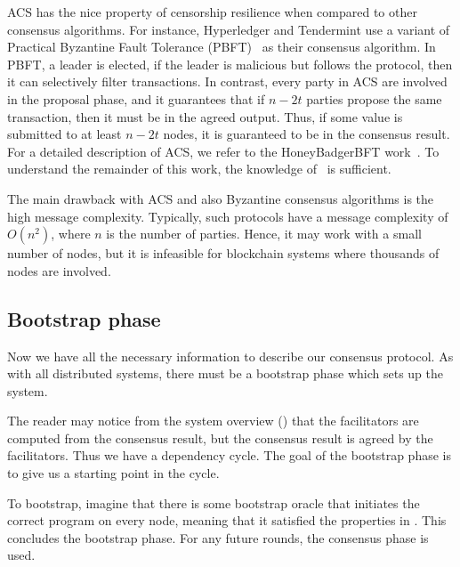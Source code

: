 ACS has the nice property of censorship resilience when compared to other consensus algorithms.
For instance, Hyperledger and Tendermint use a variant of Practical Byzantine Fault Tolerance (PBFT)~\cite{castro1999practical} as their consensus algorithm.
In PBFT, a leader is elected, if the leader is malicious but follows the protocol, then it can selectively filter transactions.
In contrast, every party in ACS are involved in the proposal phase,
and it guarantees that if $n - 2t$ parties propose the same transaction, then it must be in the agreed output.
Thus, if some value is submitted to at least $n - 2t$ nodes, it is guaranteed to be in the consensus result.
For a detailed description of ACS, we refer to the HoneyBadgerBFT work~\cite{miller2016honey}.
To understand the remainder of this work, the knowledge of~ is sufficient.

The main drawback with ACS and also Byzantine consensus algorithms is the high message complexity.
Typically, such protocols have a message complexity of $O(n^2)$, where $n$ is the number of parties.
Hence, it may work with a small number of nodes,
but it is infeasible for blockchain systems where thousands of nodes are involved.




\subsection{Bootstrap phase}
\label{sec:bootstrap}
Now we have all the necessary information to describe our consensus protocol.
As with all distributed systems, there must be a bootstrap phase which sets up the system.

The reader may notice from the system overview () that the facilitators are computed from the consensus result,
but the consensus result is agreed by the facilitators.
Thus we have a dependency cycle.
The goal of the bootstrap phase is to give us a starting point in the cycle.

To bootstrap, imagine that there is some bootstrap oracle that initiates the correct program on every node,
meaning that it satisfied the properties in .
This concludes the bootstrap phase.
For any future rounds, the consensus phase is used.

